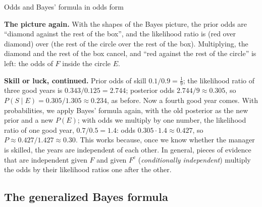\begin{key}{Odds and Bayes' formula in odds form}
	\noindent\begin{minipage}{\linewidth}
		\textbf{The picture again.} With the shapes of the Bayes picture, the
		prior odds are ``diamond against the rest of the box'', and the
		likelihood ratio is (red over diamond) over (the rest of the circle
		over the rest of the box). Multiplying, the diamond and the rest of the
		box cancel, and ``red against the rest of the circle'' is left: the
		odds of $F$ inside the circle $E$.
		\begin{center}
			\bayesvenn[.6]\qquad\bayesodds[.95]
		\end{center}
	\end{minipage}

	\textbf{Skill or luck, continued.} Prior odds of skill
	$0.1/0.9=\frac19$; the likelihood ratio of three good years is
	$0.343/0.125=2.744$; posterior odds $2.744/9\approx0.305$, so
	$P(S\mid E)=0.305/1.305\approx0.234$, as before. Now a fourth good year
	comes. With probabilities, we apply Bayes' formula again, with the old
	posterior as the new prior and a new $P(E)$; with odds we multiply by one number, the likelihood ratio of one good year,
	$0.7/0.5=1.4$: odds $0.305\cdot1.4\approx0.427$, so
	$P\approx0.427/1.427\approx0.30$. This works because, once we know whether
	the manager is skilled, the years are independent of each other. In
	general, pieces of evidence that are independent given $F$ and given
	$F^c$ (\emph{conditionally independent}) multiply the odds by their
	likelihood ratios one after the other.
\end{key}


\subsection*{The generalized Bayes formula}

